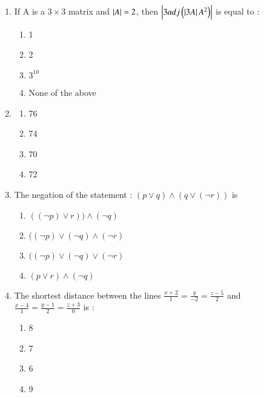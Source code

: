 \documentclass[journal]{IEEEtran}
\begin{document}
\begin{enumerate}
    \item If A is a $3\times 3$ matrix and $\left\vert A\right\vert=2$, then $\left\vert3adj\left(\left\vert3A\right\vert A^{2}\right)\right\vert$ is equal to :
		\begin{multicols}{1}
			\begin{enumerate}
				\item 1
    \item 2
    \item $3^{10}$
    \item None of the above
			\end{enumerate}
		\end{multicols}

    \item 
		\begin{multicols}{1}
			\begin{enumerate}
				
				\item 76
    \item 74
     \item 70
      \item 72
			\end{enumerate}
		\end{multicols}

    \item The negation of the statement : $(p \lor q) \land (q \lor (\neg r))$ is
    \begin{multicols}{1}
            \begin{enumerate}
              \item $((\neg p) \lor r)) \land (\neg q)$
              \item  $((\neg p) \lor (\neg q) \land(\neg r)$
              \item  $((\neg p) \lor (\neg q) \lor(\neg r)$
              \item $(p \lor r) \land  (\neg q)$
            \end{enumerate}
        \end{multicols}
    \item The shortest distance between the lines $\frac{x+2}{1}=\frac{y}{-2}=\frac{z-5}{2} $ and $\frac{x-4}{1}=\frac{y-1}{2}=\frac{z+3}{0}$ is :
    \begin{multicols}{1}
            \begin{enumerate}
              \item 8
              \item  7
              \item  6
              \item 9
            \end{enumerate}
        \end{multicols}


\end{enumerate}
\end{document}
